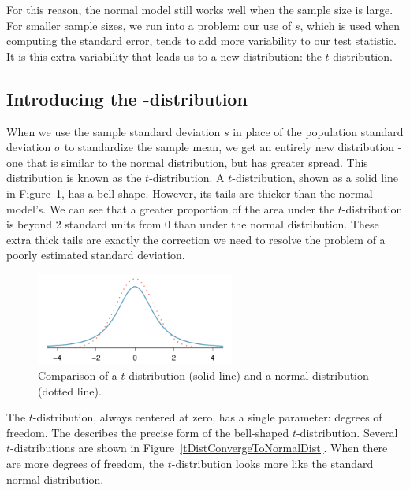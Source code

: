 For this reason, the normal model still works well when the sample size is large. For smaller sample sizes, we run into a problem: our use of $s$, which is used when computing the standard error, tends to add more variability to our test statistic. It is this extra variability that leads us to a new distribution: the \mbox{$t$-distribution}.


\subsection[Introducing the $t$-distribution]{Introducing the -distribution}
\label{introducingTheTDistribution}


When we use the sample standard deviation $s$ in place of the population standard deviation $\sigma$ to standardize the sample mean, we get an entirely new distribution - one that is similar to the normal distribution, but has greater spread. This distribution is known as the $t$-distribution. A $t$-distribution, shown as a solid line in Figure~\ref{tDistCompareToNormalDist}, has a bell shape. However, its tails are thicker than the normal model's. We can see that a greater proportion of the area under the $t$-distribution is beyond 2 standard units from 0 than under the normal distribution.  These extra thick tails are exactly the correction we need to resolve the problem of a poorly estimated standard deviation.

\begin{figure}[h]
\centering
\includegraphics[width=0.58\textwidth]{ch_inference_for_means/figures/tDistCompareToNormalDist/tDistCompareToNormalDist}
\caption{Comparison of a $t$-distribution (solid line) and a normal distribution (dotted line).}
\label{tDistCompareToNormalDist}
\end{figure}

The $t$-distribution, always centered at zero, has a single parameter: degrees of freedom. The  describes the precise form of the bell-shaped $t$-distribution. Several $t$-distributions are shown in Figure~\ref{tDistConvergeToNormalDist}. When there are more degrees of freedom, the $t$-distribution looks more like the standard normal distribution.

